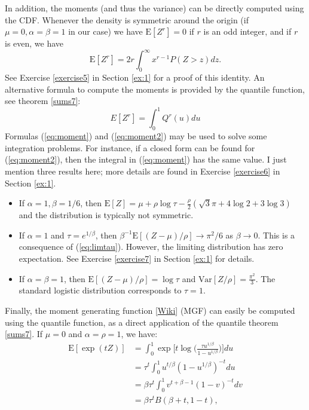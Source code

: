 \documentclass[10pt]{article}
\begin{document}
In addition, the moments (and thus the variance) can be directly computed using the CDF. Whenever the density is symmetric around the origin (if $\mu=0,\alpha=\beta=1$ in our case)  we have $\mbox{E}[Z^r]=0$ if $r$ is an odd integer, and if $r$ is even, we have
\begin{equation}
\mbox{E}[Z^r]=2r\int_0^\infty x^{r-1} P(Z>z)dz. \label{eq:moment}
\end{equation}
See Exercise \ref{exercise5} in Section \ref{ex:1} for a proof of this identity.  An alternative formula to compute the moments is provided by the quantile function, see theorem \ref{sums7}:
\begin{equation}
E[Z^r]=\int_0^1  Q^r(u)du \label{eq:moment2}
\end{equation}
Formulas (\ref{eq:moment}) and (\ref{eq:moment2}) may be used to solve some integration problems. For instance, if a closed form can be found for (\ref{eq:moment2}), then the integral in (\ref{eq:moment}) has the same value. I just mention three results here; more details are found in Exercise \ref{exercise6} in Section \ref{ex:1}.
\begin{itemize}
\item If $\alpha=1,\beta=1/6$, then $\mbox{E}[Z]=\mu+\rho\log\tau -\frac{\rho}{2}(\sqrt{3}\pi +4\log 2 +3\log 3)$ and the distribution is typically not symmetric. 
\item If $\alpha=1$ and $\tau=e^{1/\beta}$, then $\beta^{-1}\mbox{E}[(Z-\mu)/\rho]\rightarrow \pi^2/6$ as  $\beta\rightarrow 0$. This is a consequence of (\ref{eq:limtau}). However, the limiting distribution has zero expectation. See Exercise \ref{exercise7} in Section \ref{ex:1} for details.
\item If $\alpha=\beta=1$, then $\mbox{E}[(Z-\mu)/\rho]=\log\tau$ and $\mbox{Var}[Z/\rho]=\frac{\pi^2}{3}$. The standard logistic distribution corresponds to $\tau=1$.
\end{itemize}
Finally, the \textcolor{index}{moment generating function} [\href{https://en.wikipedia.org/wiki/Moment-generating_function}{Wiki}] (MGF)  can easily be computed using the quantile function, as a direct application of the \textcolor{index}{quantile theorem} \ref{sums7}. If $\mu=0$ and $\alpha=\rho=1$, we have:
\begin{align}
\mbox{E}[\exp(tZ)] & =\int_0^1 \exp\Big[t\log\Big(\frac{\tau u^{1/\beta}}{1-u^{1/\beta}}\Big)\Big]  du\nonumber \\
    & = \tau^t \int_0^1 u^{t/\beta}(1-u^{1/\beta})^{-t} du \nonumber \\
   & = \beta\tau^t \int_0^1 v^{t+\beta-1}(1-v)^{-t}dv\nonumber \\
  & = \beta\tau^{t}B(\beta+t,1-t) \label{eq:qt},
\end{align}
\end{document}

